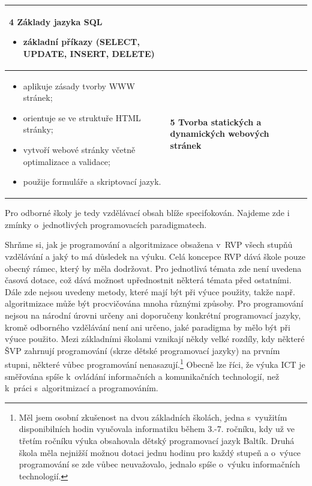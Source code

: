 \documentclass[FP,DP]{tulthesis}
\begin{document}
{{\begin{table}[ht]
\begin{tabular}{|l|l|}
\begin{minipage}[t]{0.45\textwidth}
\textbf{4 Základy jazyka SQL}
    \begin{itemize}[leftmargin=*,nosep]
  \item základní příkazy (SELECT, UPDATE, INSERT, DELETE)
\end{itemize}
  \end{minipage}\\\hline
  \begin{minipage}[t]{0.45\textwidth}
\begin{itemize}[leftmargin=*,nosep]
  	\item aplikuje zásady tvorby WWW stránek; 
	\item orientuje se ve struktuře HTML stránky;
  	\item vytvoří webové stránky včetně optimalizace a validace; 
	\item použije formuláře a skriptovací jazyk.
\end{itemize}
  \end{minipage} &
  \begin{minipage}[t]{0.45\textwidth}
\textbf{5 Tvorba statických a dynamických webových stránek }
  \end{minipage}\\\hline
\end{tabular}


\end{table}



Pro odborné školy je tedy vzdělávací obsah blíže specifokován. Najdeme zde i zmínky o~jednotlivých programovacích paradigmatech. 


Shrňme si, jak je programování a algoritmizace obsažena v~RVP všech stupňů vzdělávání a jaký to má důsledek na výuku.
Celá koncepce RVP dává škole pouze obecný rámec, který by měla dodržovat. Pro jednotlivá témata zde není uvedena časová dotace, což dává možnost upřednostnit některá témata před ostatními. Dále zde nejsou uvedeny metody, které mají být při výuce použity, takže např. algoritmizace může být procvičována mnoha různými způsoby.  Pro programování nejsou na národní úrovni určeny ani doporučeny konkrétní programovací jazyky, kromě odborného vzdělávání není ani určeno, jaké paradigma by mělo být při výuce použito. Mezi základními školami vznikají někdy velké rozdíly, kdy některé ŠVP zahrnují programování (skrze dětské programovací jazyky) na prvním stupni, některé vůbec programování nenasazují.\footnote{Měl jsem osobní zkušenost na dvou základních školách, jedna s~využitím disponibilních hodin vyučovala informatiku během 3.-7. ročníku, kdy už ve třetím ročníku výuka obsahovala dětský programovací jazyk Baltík. Druhá škola měla nejnižší možnou dotaci jednu hodinu pro každý stupeň a o~výuce programování se zde vůbec neuvažovalo, jednalo spíše o~výuku informačních technologií.} Obecně lze říci, že výuka ICT je směřována spíše k~ovládání informačních a komunikačních technologií, než k~práci s~algoritmizací a programováním.

}}
\end{document}
